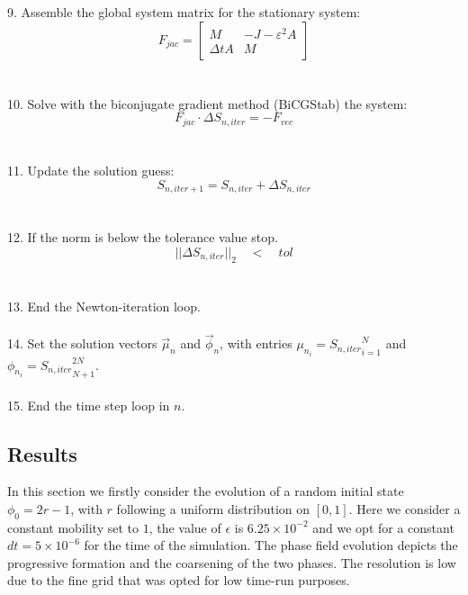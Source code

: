 \documentclass{article}
\begin{document}
9. Assemble the global system matrix for the stationary system:\\
\begin{equation}
 F_{jac} = \left[ 
    \begin{array}{cc} 
      M & -J-\varepsilon^2A \\ 
      \Delta t A & M
    \end{array} 
    \right]
\end{equation}\\\\

10. Solve with the biconjugate gradient method (BiCGStab) the system:\\
\begin{equation}
F_{jac}\cdot \Delta S_{n,iter} = - F_{vec}
\end{equation}\\\\

11. Update the solution guess:\\
\begin{equation}
S_{n,iter+1} = S_{n,iter} + \Delta S_{n,iter}
\end{equation}\\\\

12. If the norm is below the tolerance value stop.\begin{equation}
||\Delta S_{n,iter}||_2 \quad < \quad tol
\end{equation} \\\\

13. End the Newton-iteration loop.\\\\

14. Set the solution vectors $\vec{\mu}_n$ and $\vec{\phi}_n$, with entries $\mu_{n_i} = {S_{n,iter}}_{i=1}^N$ and $\phi_{n_i} = {S_{n,iter}}_{N+1}^{2N}$.\\\\


15. End the time step loop in $n$.

\subsection{Results}
In this section we firstly consider the evolution of a random initial state $\phi_{0}=2r-1$, with $r$ following a uniform distribution on $[0,1]$. Here we consider a constant mobility set to $1$, the value of $\epsilon$ is $6.25\times10^{-2}$ and we opt for a constant $dt=5\times10^{-6}$ for the time of the simulation. The phase field evolution depicts the progressive formation and the coarsening of the two phases. The resolution is low due to the fine grid that was opted for low time-run purposes.
\clearpage
\vfill
\end{document}
